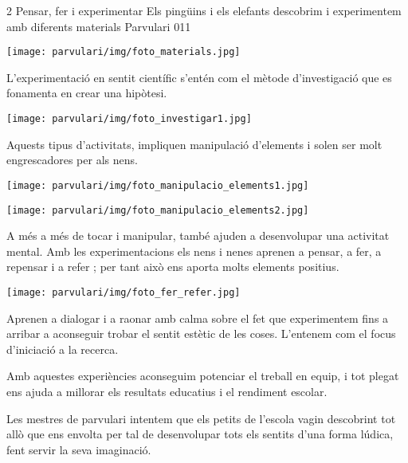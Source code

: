 \begin{news}
{2} %
{Pensar, fer i experimentar}
{Els pingüins i els elefants descobrim i experimentem amb diferents materials}
{Parvulari}
{011} %






\noindent\texttt{[image: parvulari/img/foto\_materials.jpg]}

L’experimentació en sentit científic s’entén com el mètode d’investigació que es fonamenta en crear una hipòtesi.

\noindent\texttt{[image: parvulari/img/foto\_investigar1.jpg]}



Aquests tipus d’activitats, impliquen manipulació d’elements i solen ser molt engrescadores per als nens.

\noindent\texttt{[image: parvulari/img/foto\_manipulacio\_elements1.jpg]}

\noindent\texttt{[image: parvulari/img/foto\_manipulacio\_elements2.jpg]}

A més a més de tocar i manipular, també ajuden a desenvolupar una  activitat mental. Amb les experimentacions els nens i nenes aprenen a pensar, a fer, a repensar i a refer ; per tant això ens aporta molts elements positius.
                         
\noindent\texttt{[image: parvulari/img/foto\_fer\_refer.jpg]}

Aprenen a dialogar i a  raonar amb calma sobre el fet que experimentem  fins a arribar a aconseguir  trobar el sentit estètic de les coses. L’entenem com el focus d’iniciació a la recerca.

Amb aquestes experiències aconseguim  potenciar el treball en equip, i tot plegat ens ajuda a millorar els resultats educatius i el rendiment escolar.

Les mestres de parvulari intentem que els petits de l’escola vagin  descobrint tot allò que ens envolta per tal de desenvolupar tots els sentits d’una forma lúdica,  fent servir la seva imaginació.
                         

\end{news}
